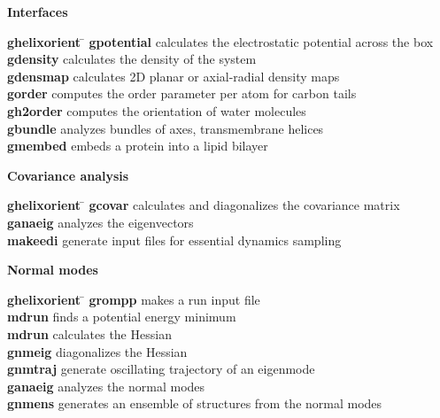 \begin{description}
\item {\large\bf Interfaces}
\vspace{-2ex}\begin{tabbing}
{\bf g\us{}helixorient} \= \kill
{\bf g\us{}potential} \> calculates the electrostatic potential across the box \\
{\bf g\us{}density} \> calculates the density of the system \\
{\bf g\us{}densmap} \> calculates 2D planar or axial-radial density maps \\
{\bf g\us{}order} \> computes the order parameter per atom for carbon tails \\
{\bf g\us{}h2order} \> computes the orientation of water molecules \\
{\bf g\us{}bundle} \> analyzes bundles of axes, {\eg} transmembrane helices \\
{\bf g\us{}membed} \> embeds a protein into a lipid bilayer \\
\end{tabbing}\vspace{-2ex}

\item {\large\bf Covariance analysis}
\vspace{-2ex}\begin{tabbing}
{\bf g\us{}helixorient} \= \kill
{\bf g\us{}covar} \> calculates and diagonalizes the covariance matrix \\
{\bf g\us{}anaeig} \> analyzes the eigenvectors \\
{\bf make\us{}edi} \> generate input files for essential dynamics sampling \\
\end{tabbing}\vspace{-2ex}

\item {\large\bf Normal modes}
\vspace{-2ex}\begin{tabbing}
{\bf g\us{}helixorient} \= \kill
{\bf grompp} \> makes a run input file \\
{\bf mdrun} \> finds a potential energy minimum \\
{\bf mdrun} \> calculates the Hessian \\
{\bf g\us{}nmeig} \> diagonalizes the Hessian  \\
{\bf g\us{}nmtraj} \> generate oscillating trajectory of an eigenmode \\
{\bf g\us{}anaeig} \> analyzes the normal modes \\
{\bf g\us{}nmens} \> generates an ensemble of structures from the normal modes \\
\end{tabbing}\vspace{-2ex}

\end{description}

